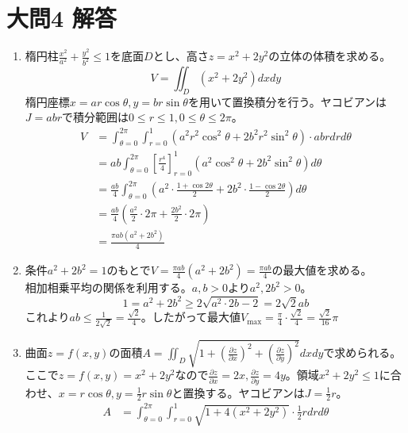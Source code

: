 \documentclass[dvipdfmx]{jsreport}
\begin{document}
\section{大問4 解答}
\begin{souanswer} %
\begin{enumerate}
	\item 楕円柱$\frac{x^2}{a^2}+ \frac{y^2}{b^2}\le 1$を底面$D$とし、高さ$z= x^2+ 2y^2$の立体の体積を求める。
\begin{equation*}
    V= \iint_D (x^2+ 2y^2)dxdy
\end{equation*}
    楕円座標$x= ar\cos{\theta}, y= br\sin{\theta}$を用いて置換積分を行う。ヤコビアンは$J= abr$で積分範囲は$0\le r\le 1, 0\le \theta\le 2\pi$。
\begin{align*}
    V
    &= \int_{\theta= 0}^{2\pi}\int_{r= 0}^1 (a^2r^2\cos^2{\theta}+ 2b^2r^2\sin^2{\theta})\cdot abrdrd\theta\\
    &= ab\int_{\theta= 0}^{2\pi}\left[\frac{r^4}{4}\right]_{r= 0}^1(a^2\cos^2{\theta}+ 2b^2\sin^2{\theta})d\theta\\
    &= \frac{ab}{4}\int_{\theta= 0}^{2\pi}\left(a^2\cdot \frac{1+ \cos{2\theta}}{2}+ 2b^2\cdot \frac{1- \cos{2\theta}}{2}\right)d\theta\\
    &= \frac{ab}{4}\left(\frac{a^2}{2}\cdot 2\pi+ \frac{2b^2}{2}\cdot 2\pi\right)\\
    &= \frac{\pi ab(a^2+ 2b^2)}{4}
\end{align*}
    \item 条件$a^2+ 2b^2= 1$のもとで$V= \frac{\pi ab}{4}(a^2+ 2b^2)= \frac{\pi ab}{4}$の最大値を求める。\\
    相加相乗平均の関係を利用する。$a, b> 0$より$a^2, 2b^2> 0$。
\begin{equation*}
    1= a^2+ 2b^2\ge 2\sqrt{a^2\cdot 2b-2}= 2\sqrt{2}ab
\end{equation*}
    これより$ab\le \frac{1}{2\sqrt{2}}= \frac{\sqrt{2}}{4}$。したがって最大値$V_\mathrm{max}= \frac{\pi}{4}\cdot \frac{\sqrt{2}}{4}= \frac{\sqrt{2}}{16}\pi$
    \item 曲面$z= f(x, y)$の面積$A= \iint_D \sqrt{1+ \left(\frac{\partial z}{\partial x}\right)^2+ \left(\frac{\partial z}{\partial y}\right)^2}dxdy$で求められる。ここで$z= f(x, y)= x^2+ 2y^2$なので$\frac{\partial z}{\partial x}= 2x, \frac{\partial z}{\partial y}= 4y$。領域$x^2+ 2y^2\le 1$に合わせ、$x= r\cos{\theta}, y= \frac{1}{2}r\sin{\theta}$と置換する。ヤコビアンは$J= \frac{1}{2}r$。
\begin{align*}
    A
    &= \int_{\theta= 0}^{2\pi}\int_{r= 0}^1 \sqrt{1+ 4(x^2+ 2y^2)}\cdot \frac{1}{2}rdrd\theta\\

\end{align*}
\end{enumerate}
\end{souanswer}
\end{document}
